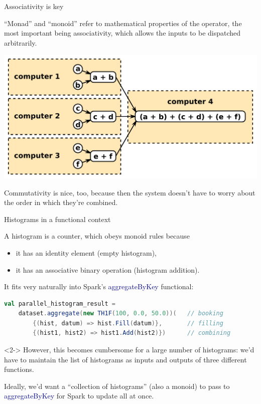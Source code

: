 \documentclass{beamer}
\begin{document}
\begin{frame}{Associativity is key}

``Monad'' and ``monoid'' refer to mathematical properties of the operator, the most important being associativity, which allows the inputs to be dispatched arbitrarily.

\begin{center}
\includegraphics[width=0.7\linewidth]{monoids.png}
\end{center}

Commutativity is nice, too, because then the system doesn't have to worry about the order in which they're combined.
\end{frame}

\begin{frame}[fragile]{Histograms in a functional context}

A histogram is a counter, which obeys monoid rules because
\begin{itemize}
\item it has an identity element (empty histogram),
\item it has an associative binary operation (histogram addition).
\end{itemize}

\vfill
It fits very naturally into Spark's \textcolor{darkblue}{aggregateByKey} functional:

\begin{lstlisting}[language=scala]
val parallel_histogram_result =
    dataset.aggregate(new TH1F(100, 0.0, 50.0))(   // booking
        {(hist, datum) => hist.Fill(datum)},       // filling
        {(hist1, hist2) => hist1.Add(hist2)})      // combining
\end{lstlisting}

\vfill
\begin{uncoverenv}<2->
However, this becomes cumbersome for a large number of histograms: we'd have to maintain the list of histograms as inputs and outputs of three different functions.

\vfill
Ideally, we'd want a ``collection of histograms'' (also a monoid) to pass to \textcolor{darkblue}{aggregateByKey} for Spark to update all at once.
\end{uncoverenv}
\end{frame}
\end{document}
